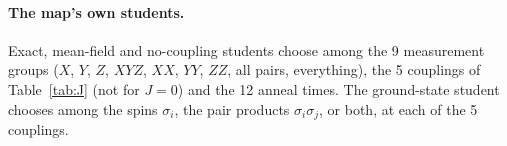 \documentclass[11pt]{article}
\begin{document}
\paragraph{The map's own students.} Exact, mean-field and no-coupling students choose among the 9 measurement
groups ($X$, $Y$, $Z$, $XYZ$, $XX$, $YY$, $ZZ$, all pairs, everything), the 5 couplings of
Table~\ref{tab:J} (not for $J=0$) and the 12 anneal times. The ground-state student chooses among the spins
$\sigma_i$, the pair products $\sigma_i\sigma_j$, or both, at each of the 5 couplings.
\end{document}
